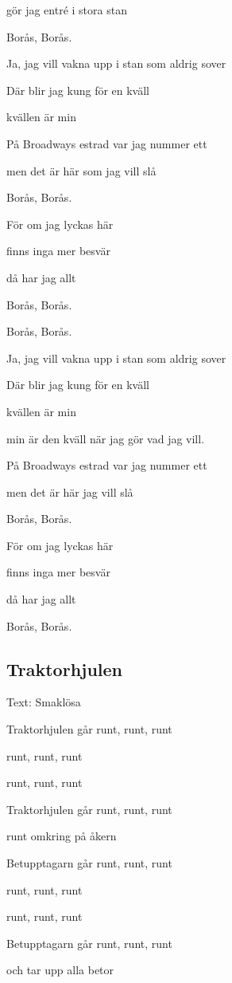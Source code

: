 gör jag entré i stora stan

Borås, Borås.\bigskip


Ja, jag vill vakna upp i stan som aldrig sover

Där blir jag kung för en kväll

kvällen är min\bigskip


På Broadways estrad var jag nummer ett

men det är här som jag vill slå

Borås, Borås.\bigskip


För om jag lyckas här

finns inga mer besvär

då har jag allt

Borås, Borås.\bigskip


Borås, Borås. \bigskip


Ja, jag vill vakna upp i stan som aldrig sover

Där blir jag kung för en kväll

kvällen är min

min är den kväll när jag gör vad jag vill.\bigskip


På Broadways estrad var jag nummer ett

men det är här jag vill slå

Borås, Borås.\bigskip


För om jag lyckas här

finns inga mer besvär

då har jag allt

Borås, Borås. \bigskip


\subsection{\textbf{Traktorhjulen}}

Text: Smaklösa\bigskip

Traktorhjulen går runt, runt, runt

runt, runt, runt

runt, runt, runt

Traktorhjulen går runt, runt, runt

runt omkring på åkern\bigskip

Betupptagarn går runt, runt, runt

runt, runt, runt

runt, runt, runt

Betupptagarn går runt, runt, runt

och tar upp alla betor\bigskip

